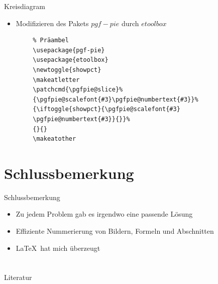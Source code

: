 \documentclass[10pt]{beamer}
\begin{document}
\begin{frame}[fragile]{Kreisdiagram}
	\begin{itemize}
		\item Modifizieren des Pakets $pgf-pie$ durch $etoolbox$
	\end{itemize}
	\begin{lstlisting}
        % Präambel
        \usepackage{pgf-pie}
        \usepackage{etoolbox}
        \newtoggle{showpct}
        \makeatletter
        \patchcmd{\pgfpie@slice}%
        {\pgfpie@scalefont{#3}\pgfpie@numbertext{#3}}%
        {\iftoggle{showpct}{\pgfpie@scalefont{#3}
        \pgfpie@numbertext{#3}}{}}%
        {}{}
        \makeatother
        \end{lstlisting}
\end{frame}

\section{Schlussbemerkung}
\begin{frame}{Schlussbemerkung}
	\begin{itemize}[<+- | alert@+>]
		\item Zu jedem Problem gab es irgendwo eine passende Lösung
		\item Effiziente Nummerierung von Bildern, Formeln und Abschnitten
		\item \LaTeX \ hat mich überzeugt
	\end{itemize}
\end{frame}

\section{}
\begin{frame}
\end{frame}


\nocite{*}
\begin{frame}[allowframebreaks]{Literatur}
    \printbibliography[]
\end{frame}
\end{document}
